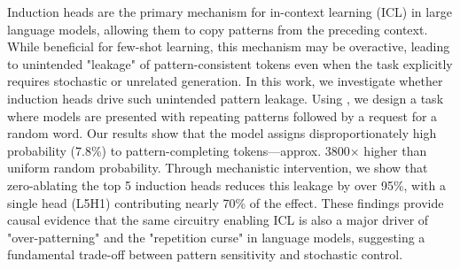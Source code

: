 Induction heads are the primary mechanism for in-context learning (ICL) in large language models, allowing them to copy patterns from the preceding context. While beneficial for few-shot learning, this mechanism may be overactive, leading to unintended "leakage" of pattern-consistent tokens even when the task explicitly requires stochastic or unrelated generation. In this work, we investigate whether induction heads drive such unintended pattern leakage. Using \gpttwo, we design a \taskname task where models are presented with repeating patterns followed by a request for a random word. Our results show that the model assigns disproportionately high probability (7.8\%) to pattern-completing tokens—approx. 3800$\times$ higher than uniform random probability. Through mechanistic intervention, we show that zero-ablating the top 5 induction heads reduces this leakage by over 95\%, with a single head (L5H1) contributing nearly 70\% of the effect. These findings provide causal evidence that the same circuitry enabling ICL is also a major driver of "over-patterning" and the "repetition curse" in language models, suggesting a fundamental trade-off between pattern sensitivity and stochastic control.
